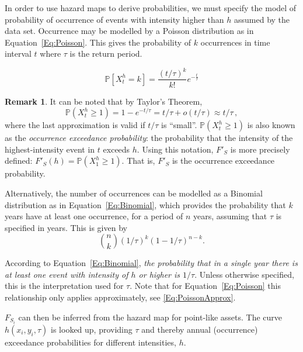 \documentclass[a4paper,11pt]{extarticle} %
\theoremstyle{definition}
\newtheorem{remarkx}[theorem]{Remark}
\newenvironment{remark}
{\pushQED{\qed}\renewcommand{\qedsymbol}{$\diamond$}\begin{remarkx}}
    {\popQED\end{remarkx}}
\begin{document}
In order to use hazard maps to derive probabilities, we must specify the model of probability of occurrence of events with intensity higher than $h$ assumed by the data set. Occurrence may be modelled by a Poisson distribution as in Equation~\ref{Eq:Poisson}. This gives the probability of $k$ occurrences in time interval $t$ where $\tau$ is the return period.

\begin{equation}
\label{Eq:Poisson}
\mathbb{P}[{X^h_t} = k] = \frac{(t / \tau)^k}{k!}  e^{-\frac{t}{\tau}}
\end{equation}


\begin{remark}
    It can be noted that by Taylor's Theorem,
\begin{equation}\label{Eq:PoissonApprox}
        \mathbb{P}(X_t^h\ge1)=1-e^{-t/\tau}=t/\tau+o\left(t/\tau\right)\approx t/\tau\,,
\end{equation}
    where the last approximation is valid if $t/\tau$ is ``small''. $\mathbb{P}(X_t^h\ge1)$ is also known as the \emph{occurrence exceedance probability}: the probability that the intensity of the highest-intensity event in $t$ exceeds $h$. Using this notation, $F'_S$ is more precisely defined: $F'_S(h) = \mathbb{P}(X_1^h\ge1)$. That is, $F'_S$ is the occurrence exceedance probability.
\end{remark}

Alternatively, the number of occurrences can be modelled as a Binomial distribution as in Equation~\ref{Eq:Binomial}, which provides the probability that $k$ years have at least one occurrence, for a period of $n$ years, assuming that $\tau$ is specified in years. This is given by
\begin{equation}
    \label{Eq:Binomial}
    \binom{n}{k} (1/\tau)^k (1-1/\tau)^{n - k}.
\end{equation}

According to Equation~\ref{Eq:Binomial}, \emph{the probability that in a single year there is at least one event with intensity of $h$ or higher is $1/\tau$}. Unless otherwise specified, this is the interpretation used for $\tau$. Note that for Equation~\ref{Eq:Poisson} this relationship only applies approximately, see \eqref{Eq:PoissonApprox}.


$F_{S_i}$ can then be inferred from the hazard map for point-like assets. The curve $h(x_i, y_i, \tau)$ is looked up, providing $\tau$ and thereby annual (occurrence) exceedance probabilities for different intensities, $h$.
\end{document}
